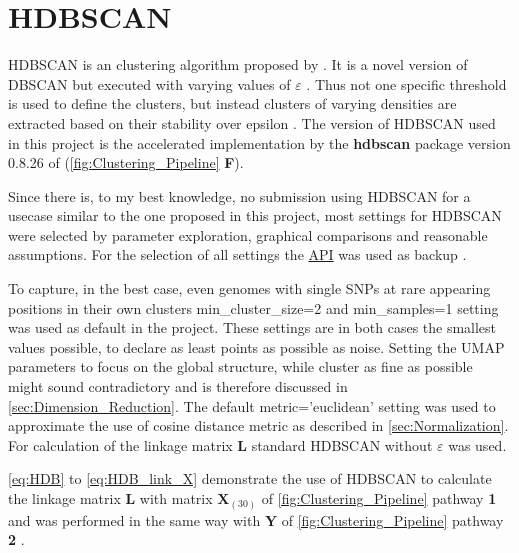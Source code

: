 \section{HDBSCAN} \label{sec:HDBSCAN}

\gls{HDBSCAN} is an clustering algorithm proposed by \textcite{campello_hierarchical_2015, hutchison_density-based_2013}. It is a novel version of \gls{DBSCAN} but executed with varying values of $\varepsilon$ \autocite{hutchison_density-based_2013}. Thus not one specific threshold is used to define the clusters, but instead clusters of varying densities are extracted based on their stability over epsilon \autocite{mcinnes_hdbscan_2017}. The version of \gls{HDBSCAN} used in this project is the accelerated implementation by the \textbf{hdbscan} package version 0.8.26 of \textcite{mcinnes_accelerated_2017} (\autoref{fig:Clustering_Pipeline} \textsf{\textbf{F}}).

Since there is, to my best knowledge, no submission using \gls{HDBSCAN} for a usecase similar to the one proposed in this project, most settings for \gls{HDBSCAN} were selected by parameter exploration, graphical comparisons and reasonable assumptions. For the selection of all settings the \href{https://hdbscan.readthedocs.io/en/latest/api.html}{API} was used as backup \autocite{mcinnes_hdbscan_2017}. 

To capture, in the best case, even genomes with single \glspl{SNP} at rare appearing positions in their own clusters \colorbox{backcolour}{min\_cluster\_size=2} and \colorbox{backcolour}{min\_samples=1} setting was used as default in the project. These settings are in both cases the smallest values possible, to declare as least points as possible as noise. Setting the \gls{UMAP} parameters to focus on the global structure, while cluster as fine as possible might sound contradictory and is therefore discussed in \autoref{sec:Dimension_Reduction}. The default \colorbox{backcolour}{metric='euclidean'} setting was used to approximate the use of cosine distance metric as described in \autoref{sec:Normalization}. For calculation of the linkage matrix $\mathbf{L}$ standard \gls{HDBSCAN} without $\varepsilon$ was used.

\autoref{eq:HDB} to \autoref{eq:HDB_link_X} demonstrate the use of \gls{HDBSCAN} to calculate the linkage matrix $\mathbf{L}$ with matrix $\mathbf{X}_{(30)}$ of \autoref{fig:Clustering_Pipeline} pathway \textsf{\textbf{1}} and was performed in the same way with $\mathbf{Y}$ of \autoref{fig:Clustering_Pipeline} pathway \textsf{\textbf{2}} \autocite{mcinnes_hdbscan_2017, gower_minimum_1969}.

